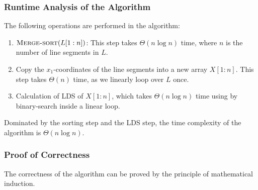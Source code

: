 \documentclass[12pt]{report}
\begin{document}
    \subsubsection*{Runtime Analysis of the Algorithm}
    The following operations are performed in the algorithm:
    \begin{enumerate}
        \item $\Call{Merge-sort}{L[1:n]}$:
        This step takes $\Theta(n \log{n})$ time, where $n$ is the number of line segments in $L$.
        \item Copy the $x_{1}$-coordinates of the line segments into a new array $X[1:n]$.
        This step takes $\Theta(n)$ time, as we linearly loop over $L$ once.
        \item Calculation of LDS of $X[1:n]$, which takes $\Theta(n \log{n})$ time using by binary-search inside a linear loop.
    \end{enumerate}
    Dominated by the sorting step and the LDS step, the time complexity of the algorithm is $\Theta(n \log{n})$.

    \subsubsection*{Proof of Correctness}
    The correctness of the algorithm can be proved by the principle of mathematical induction.
\end{document}
